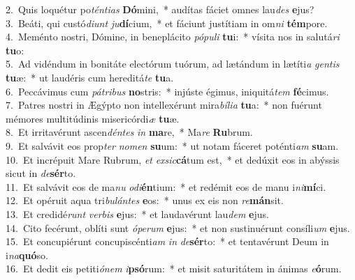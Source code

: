 {2.~}Quis loquétur po\textit{tén}\textit{ti}\textit{as} \textbf{Dó}mini,~* audítas fáciet omnes lau\textit{des} \textbf{e}jus?\\
{3.~}Beáti, qui custó\textit{di}\textit{unt} \textit{ju}\textbf{dí}cium,~* et fáciunt justítiam in om\textit{ni} \textbf{tém}pore.\\
{4.~}Meménto nostri, Dómine, in beneplácito \textit{pó}\textit{pu}\textit{li} \textbf{tu}i:~* vísita nos in salutá\textit{ri} \textbf{tu}o:\\
{5.~}Ad vidéndum in bonitáte electórum tuórum, ad lætándum in lætíti\textit{a} \textit{gen}\textit{tis} \textbf{tu}æ:~* ut laudéris cum hereditá\textit{te} \textbf{tu}a.\\
{6.~}Peccávimus cum \textit{pá}\textit{tri}\textit{bus} \textbf{no}stris:~* injúste égimus, iniquitá\textit{tem} \textbf{fé}cimus.\\
{7.~}Patres nostri in Ægýpto non intellexérunt mira\textit{bí}\textit{li}\textit{a} \textbf{tu}a:~* non fuérunt mémores multitúdinis misericórdi\textit{æ} \textbf{tu}æ.\\
{8.~}Et irritavérunt ascen\textit{dén}\textit{tes} \textit{in} \textbf{ma}re,~* Ma\textit{re} \textbf{Ru}brum.\\
{9.~}Et salvávit eos prop\textit{ter} \textit{no}\textit{men} \textbf{su}um:~* ut notam fáceret poténti\textit{am} \textbf{su}am.\\
{10.~}Et incrépuit Mare Rubrum, \textit{et} \textit{ex}\textit{sic}\textbf{cá}tum est,~* et dedúxit eos in abýssis sicut in \textit{de}\textbf{sér}to.\\
{11.~}Et salvávit eos de ma\textit{nu} \textit{o}\textit{di}\textbf{én}tium:~* et redémit eos de manu i\textit{ni}\textbf{mí}ci.\\
{12.~}Et opéruit aqua tri\textit{bu}\textit{lán}\textit{tes} \textbf{e}os:~* unus ex eis non \textit{re}\textbf{mán}sit.\\
{13.~}Et credidé\textit{runt} \textit{ver}\textit{bis} \textbf{e}jus:~* et laudavérunt lau\textit{dem} \textbf{e}jus.\\
{14.~}Cito fecérunt, oblíti sunt \textit{ó}\textit{pe}\textit{rum} \textbf{e}jus:~* et non sustinuérunt consíli\textit{um} \textbf{e}jus.\\
{15.~}Et concupiérunt concupiscénti\textit{am} \textit{in} \textit{de}\textbf{sér}to:~* et tentavérunt Deum in i\textit{na}\textbf{quó}so.\\
{16.~}Et dedit eis petiti\textit{ó}\textit{nem} \textit{i}\textbf{psó}rum:~* et misit saturitátem in ánimas \textit{e}\textbf{ó}rum.\\

